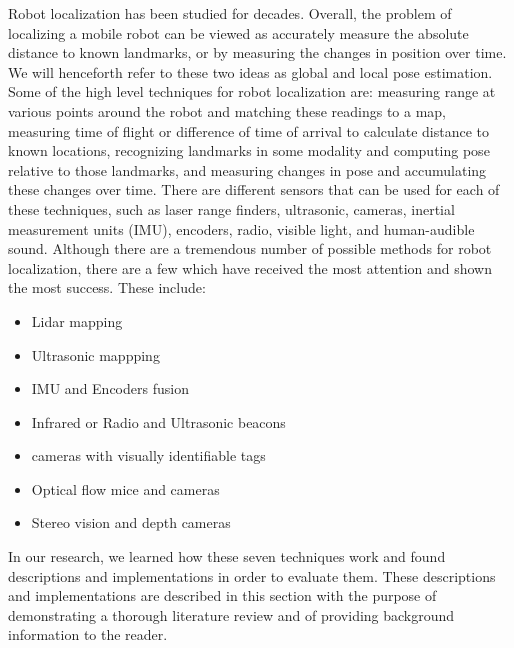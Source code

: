 \documentclass{article}
\begin{document}
Robot localization has been studied for decades. Overall, the problem of localizing a mobile robot can be viewed as accurately measure the absolute distance to known landmarks, or by measuring the changes in position over time. We will henceforth refer to these two ideas as global and local pose estimation. Some of the high level techniques for robot localization are: measuring range at various points around the robot and matching these readings to a map, measuring time of flight or difference of time of arrival to calculate distance to known locations, recognizing landmarks in some modality and computing pose relative to those landmarks, and measuring changes in pose and accumulating these changes over time. There are different sensors that can be used for each of these techniques, such as laser range finders, ultrasonic, cameras, inertial measurement units (IMU), encoders, radio, visible light, and human-audible sound. Although there are a tremendous number of possible methods for robot localization, there are a few which have received the most attention and shown the most success. These include:
\begin{itemize}
    \item Lidar mapping
    \item Ultrasonic mappping
    \item IMU and Encoders fusion
    \item Infrared or Radio and Ultrasonic beacons
    \item cameras with visually identifiable tags
    \item Optical flow mice and cameras
    \item Stereo vision and depth cameras
\end{itemize}

In our research, we learned how these seven techniques work and found descriptions and implementations in order to evaluate them. These descriptions and implementations are described in this section with the purpose of demonstrating a thorough literature review and of providing background information to the reader.
\end{document}
